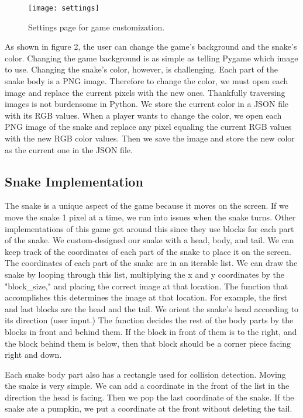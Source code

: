 \documentclass[sigplan,screen]{acmart}
\begin{document}
\begin{figure}[h]
  \centering
  \texttt{[image: settings]}
  \caption{Settings page for game customization.}
\end{figure}

As shown in figure 2, the user can change the game's background and the snake's color. Changing the game background is as simple as telling Pygame which image to use. Changing the snake's color, however, is challenging. Each part of the snake body is a PNG image. Therefore to change the color, we must open each image and replace the current pixels with the new ones. Thankfully traversing images is not burdensome in Python. We store the current color in a JSON file with its RGB values. When a player wants to change the color, we open each PNG image of the snake and replace any pixel equaling the current RGB values with the new RGB color values. Then we save the image and store the new color as the current one in the JSON file. 

\subsection{Snake Implementation}

The snake is a unique aspect of the game because it moves on the screen. If we move the snake 1 pixel at a time, we run into issues when the snake turns. Other implementations of this game get around this since they use blocks for each part of the snake. We custom-designed our snake with a head, body, and tail. We can keep track of the coordinates of each part of the snake to place it on the screen. The coordinates of each part of the snake are in an iterable list. We can draw the snake by looping through this list, multiplying the x and y coordinates by the "block\_size," and placing the correct image at that location. The function that accomplishes this determines the image at that location. For example, the first and last blocks are the head and the tail. We orient the snake's head according to its direction (user input.) The function decides the rest of the body parts by the blocks in front and behind them. If the block in front of them is to the right, and the block behind them is below, then that block should be a corner piece facing right and down.

Each snake body part also has a rectangle used for collision detection. Moving the snake is very simple. We can add a coordinate in the front of the list in the direction the head is facing. Then we pop the last coordinate of the snake. If the snake ate a pumpkin, we put a coordinate at the front without deleting the tail. 
\end{document}
